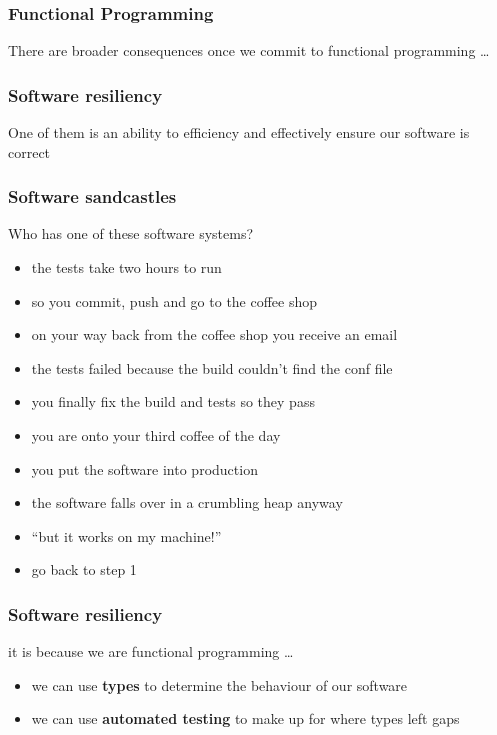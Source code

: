 \begin{frame}
\frametitle{Functional Programming}
\begin{center}
There are broader consequences once we commit to functional programming \ldots
\end{center}
\end{frame}

\begin{frame}
\frametitle{Software resiliency}
\begin{center}
One of them is an ability to efficiency and effectively ensure our software is correct
\end{center}
\end{frame}

\begin{frame}
\frametitle{Software sandcastles}
\begin{block}{Who has one of these software systems?}
\begin{itemize}
\item<1-> the tests take two hours to run
\item<2-> so you commit, push and go to the coffee shop
\item<3-> on your way back from the coffee shop you receive an email
\item<4-> the tests failed because the build couldn't find the conf file
\item<5-> you finally fix the build and tests so they pass
\item<6-> you are onto your third coffee of the day
\item<7-> you put the software into production
\item<8-> the software falls over in a crumbling heap anyway
\item<9-> ``but it works on my machine!''
\item<9-> go back to step 1
\end{itemize}
\end{block}
\end{frame}

\begin{frame}
\frametitle{Software resiliency}
\begin{block}{it is because we are functional programming \ldots}
\begin{itemize}
\item<1> we can use \textbf{types} to determine the behaviour of our software
\item<2> we can use \textbf{automated testing} to make up for where types left gaps
\end{itemize}
\end{block}
\end{frame}

